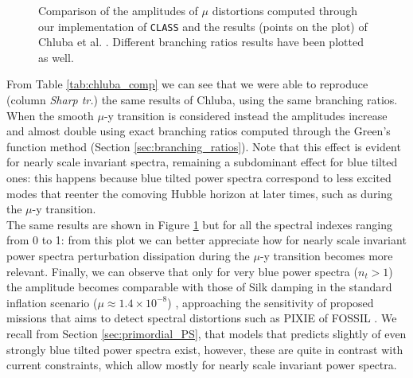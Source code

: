 \begin{figure}
    \centering
{}
\caption{Comparison of the amplitudes of $\mu$ distortions computed through our implementation of \texttt{\texttt{CLASS}} and the results (points on the plot) of Chluba et al. \cite{Chluba_tens_diss}. Different branching ratios results have been plotted as well. }
\label{fig:mu_amplitudes}
\end{figure}
From Table \ref{tab:chluba_comp} we can see that we were able to reproduce (column \emph{Sharp tr.}) the same results of Chluba, using the same branching ratios. When the smooth $\mu$-y transition is considered instead the amplitudes increase and almost double using exact branching ratios computed through the Green's function method (Section \ref{sec:branching_ratios}). Note that this effect is evident for nearly scale invariant spectra, remaining a subdominant effect for blue tilted ones: this happens because blue tilted power spectra correspond to less excited modes that reenter the comoving Hubble horizon at later times, such as during the $\mu$-y transition.\\ The same results are shown in Figure \ref{fig:mu_amplitudes} but for all the spectral indexes ranging from 0 to 1: from this plot we can better appreciate how for nearly scale invariant power spectra perturbation dissipation during the $\mu$-y transition becomes more relevant. Finally, we can observe that only for very blue power spectra ($n_t>1$) the amplitude becomes comparable with those of Silk damping in the standard inflation scenario ($\mu\approx1.4\times10^{-8}$) \cite{Chluba_2x2}, approaching the sensitivity of proposed missions that aims to detect spectral distortions such as PIXIE \cite{pixie} of FOSSIL \cite{IAS_Fossil}. We recall from Section \ref{sec:primordial_PS}, that models that predicts slightly of even strongly blue tilted power spectra exist, however, these are quite in contrast with current constraints, which allow mostly for nearly scale invariant power spectra. 

